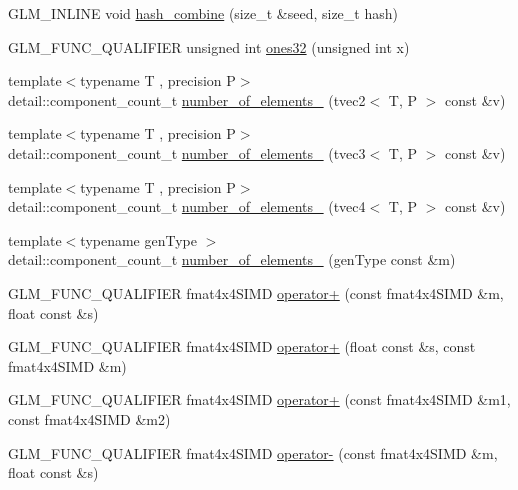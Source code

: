 \begin{DoxyCompactItemize}
\item 
G\+L\+M\+\_\+\+I\+N\+L\+I\+N\+E void \hyperlink{namespaceglm_1_1detail_a391b3eb8d7f4662a1b31046bd69f2755}{hash\+\_\+combine} (size\+\_\+t \&seed, size\+\_\+t hash)
\item 
G\+L\+M\+\_\+\+F\+U\+N\+C\+\_\+\+Q\+U\+A\+L\+I\+F\+I\+E\+R unsigned int \hyperlink{namespaceglm_1_1detail_a2699e3b3ea6ad8d4bb99aed56761582c}{ones32} (unsigned int x)
\item 
{\footnotesize template$<$typename T , precision P$>$ }\\detail\+::component\+\_\+count\+\_\+t \hyperlink{namespaceglm_1_1detail_a3dcd14ee9e14689d049f393f6bfa82cf}{number\+\_\+of\+\_\+elements\+\_\+} (tvec2$<$ T, P $>$ const \&v)
\item 
{\footnotesize template$<$typename T , precision P$>$ }\\detail\+::component\+\_\+count\+\_\+t \hyperlink{namespaceglm_1_1detail_aee2c66c6e1cb29f5732466efaa135cf2}{number\+\_\+of\+\_\+elements\+\_\+} (tvec3$<$ T, P $>$ const \&v)
\item 
{\footnotesize template$<$typename T , precision P$>$ }\\detail\+::component\+\_\+count\+\_\+t \hyperlink{namespaceglm_1_1detail_af712c2f6de26f8ec64ac8b031248fbe3}{number\+\_\+of\+\_\+elements\+\_\+} (tvec4$<$ T, P $>$ const \&v)
\item 
{\footnotesize template$<$typename gen\+Type $>$ }\\detail\+::component\+\_\+count\+\_\+t \hyperlink{namespaceglm_1_1detail_a12714908ee616d999cc5b3ba18df118b}{number\+\_\+of\+\_\+elements\+\_\+} (gen\+Type const \&m)
\item 
G\+L\+M\+\_\+\+F\+U\+N\+C\+\_\+\+Q\+U\+A\+L\+I\+F\+I\+E\+R fmat4x4\+S\+I\+M\+D \hyperlink{namespaceglm_1_1detail_a629935a47dc01b2cd4aa5598f364e359}{operator+} (const fmat4x4\+S\+I\+M\+D \&m, float const \&s)
\item 
G\+L\+M\+\_\+\+F\+U\+N\+C\+\_\+\+Q\+U\+A\+L\+I\+F\+I\+E\+R fmat4x4\+S\+I\+M\+D \hyperlink{namespaceglm_1_1detail_a4b632f8b13f05642eea7d551815f0923}{operator+} (float const \&s, const fmat4x4\+S\+I\+M\+D \&m)
\item 
G\+L\+M\+\_\+\+F\+U\+N\+C\+\_\+\+Q\+U\+A\+L\+I\+F\+I\+E\+R fmat4x4\+S\+I\+M\+D \hyperlink{namespaceglm_1_1detail_a9f20d29252cc62031ba3b05aff1d2fe8}{operator+} (const fmat4x4\+S\+I\+M\+D \&m1, const fmat4x4\+S\+I\+M\+D \&m2)
\item 
G\+L\+M\+\_\+\+F\+U\+N\+C\+\_\+\+Q\+U\+A\+L\+I\+F\+I\+E\+R fmat4x4\+S\+I\+M\+D \hyperlink{namespaceglm_1_1detail_aab9939909f4d23c042e7d438dda5caca}{operator-\/} (const fmat4x4\+S\+I\+M\+D \&m, float const \&s)

\end{DoxyCompactItemize}
